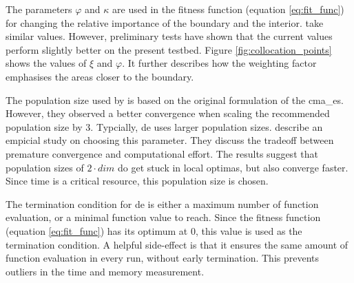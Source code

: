 \documentclass[./\jobname.tex]{subfiles}
\begin{document}
The parameters $\varphi$ and $\kappa$ are used in the fitness function (equation \ref{eq:fit_func}) for changing the relative importance of the boundary and the interior. \cite{chaquet_using_2019} take similar values. However, preliminary tests have shown that the current values perform slightly better on the present testbed. Figure \ref{fig:collocation_points} shows the values of $\xi$ and $\varphi$. It further describes how the weighting factor emphasises the areas closer to the boundary. 

\begin{figure}[h]
	\centering
	\noindent{}
	\label{fig:collocation_weight}
\end{figure}

The population size used by \cite{chaquet_using_2019} is based on the original formulation of the \gls{cma_es}. However, they observed a better convergence when scaling the recommended population size by 3. Typcially, \gls{de} uses larger population sizes. \cite{mallipeddi_empirical_2008} describe an empicial study on choosing this parameter. They discuss the tradeoff between premature convergence and computational effort. The results suggest that population sizes of $2\cdot dim$ do get stuck in local optimas, but also converge faster. Since time is a critical resource, this population size is chosen. 

The termination condition for \gls{de} is either a maximum number of function evaluation, or a minimal function value to reach. Since the fitness function (equation \ref{eq:fit_func}) has its optimum at 0, this value is used as the termination condition. A helpful side-effect is that it ensures the same amount of function evaluation in every run, without early termination. This prevents outliers in the time and memory measurement. 
\end{document}
